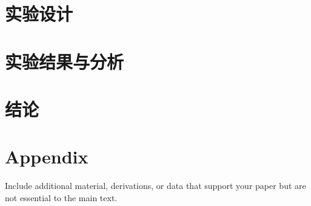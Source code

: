 \documentclass[12pt]{article}
\begin{document}
\section{实验设计}

\section{实验结果与分析}

\section{结论}




\appendix
\section{Appendix}
Include additional material, derivations, or data that support your paper but are not essential to the main text.
\end{document}
